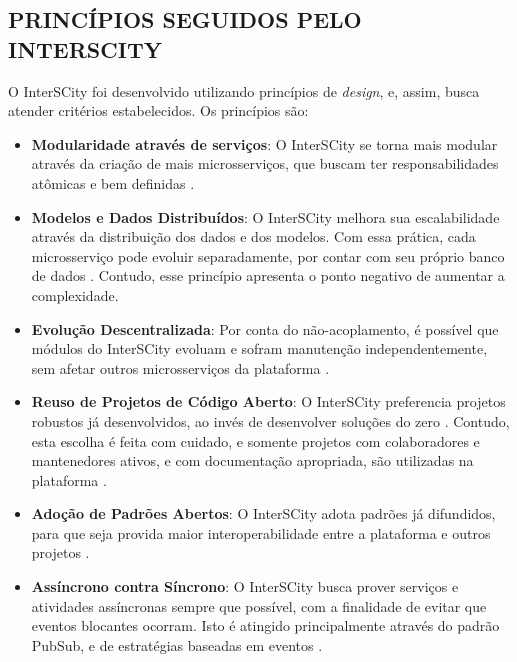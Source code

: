 \begin{apendicesenv}
%
\partapendices
%
\chapter{PRINCÍPIOS SEGUIDOS PELO INTERSCITY}
\label{appendix:principles}

O InterSCity foi desenvolvido utilizando princípios de \textit{design}, e,
assim, busca atender critérios estabelecidos. Os princípios são:

\begin{itemize}
    \item \textbf{Modularidade através de serviços}: O InterSCity se torna mais
modular através da criação de mais microsserviços, que buscam ter
responsabilidades atômicas e bem definidas \cite{delesposte2017}.

    \item \textbf{Modelos e Dados Distribuídos}: O InterSCity melhora sua
escalabilidade através da distribuição dos dados e dos modelos. Com essa
prática, cada microsserviço pode evoluir separadamente, por contar com seu
próprio banco de dados \cite{delesposte2017}. Contudo, esse princípio apresenta
o ponto negativo de aumentar a complexidade.

    \item \textbf{Evolução Descentralizada}: Por conta do não-acoplamento, é
possível que módulos do InterSCity evoluam e sofram manutenção
independentemente, sem afetar outros microsserviços da plataforma
\cite{delesposte2017}.

    \item \textbf{Reuso de Projetos de Código Aberto}: O InterSCity preferencia %
projetos robustos já desenvolvidos, ao invés de desenvolver soluções do zero
\cite{delesposte2017}. Contudo, esta escolha é feita com cuidado, e somente
projetos com colaboradores e mantenedores ativos, e com documentação
apropriada, são utilizadas na plataforma \cite{delesposte2017}.

    \item \textbf{Adoção de Padrões Abertos}: O InterSCity adota padrões já
difundidos, para que seja provida maior interoperabilidade entre a plataforma
e outros projetos \cite{delesposte2017}.

    \item \textbf{Assíncrono contra Síncrono}: O InterSCity busca prover
serviços e atividades assíncronas sempre que possível, com a finalidade de
evitar que eventos blocantes ocorram. Isto é atingido principalmente através
do padrão PubSub, e de estratégias baseadas em eventos \cite{delesposte2017}.


\end{itemize}
\end{apendicesenv}
